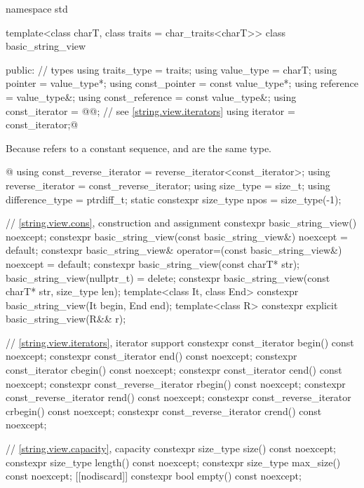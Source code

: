 \begin{codeblock}
namespace std {
  template<class charT, class traits = char_traits<charT>>
  class basic_string_view {
  public:
    // types
    using traits_type            = traits;
    using value_type             = charT;
    using pointer                = value_type*;
    using const_pointer          = const value_type*;
    using reference              = value_type&;
    using const_reference        = const value_type&;
    using const_iterator         = @@; // see \ref{string.view.iterators}
    using iterator               = const_iterator;@
\begin{footnote}
Because  refers to a constant sequence,  and  are the same type.
\end{footnote}@
    using const_reverse_iterator = reverse_iterator<const_iterator>;
    using reverse_iterator       = const_reverse_iterator;
    using size_type              = size_t;
    using difference_type        = ptrdiff_t;
    static constexpr size_type npos = size_type(-1);

    // \ref{string.view.cons}, construction and assignment
    constexpr basic_string_view() noexcept;
    constexpr basic_string_view(const basic_string_view&) noexcept = default;
    constexpr basic_string_view& operator=(const basic_string_view&) noexcept = default;
    constexpr basic_string_view(const charT* str);
    basic_string_view(nullptr_t) = delete;
    constexpr basic_string_view(const charT* str, size_type len);
    template<class It, class End>
      constexpr basic_string_view(It begin, End end);
    template<class R>
      constexpr explicit basic_string_view(R&& r);

    // \ref{string.view.iterators}, iterator support
    constexpr const_iterator begin() const noexcept;
    constexpr const_iterator end() const noexcept;
    constexpr const_iterator cbegin() const noexcept;
    constexpr const_iterator cend() const noexcept;
    constexpr const_reverse_iterator rbegin() const noexcept;
    constexpr const_reverse_iterator rend() const noexcept;
    constexpr const_reverse_iterator crbegin() const noexcept;
    constexpr const_reverse_iterator crend() const noexcept;

    // \ref{string.view.capacity}, capacity
    constexpr size_type size() const noexcept;
    constexpr size_type length() const noexcept;
    constexpr size_type max_size() const noexcept;
    [[nodiscard]] constexpr bool empty() const noexcept;

}}
\end{codeblock}
